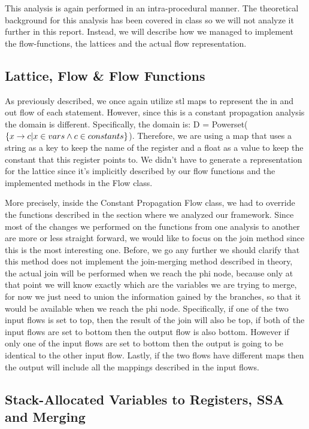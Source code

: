 This analysis is again performed in an intra-procedural manner. The theoretical background for this analysis has been covered in class so we will not analyze it further in this report. Instead, we will describe how we managed to implement the flow-functions, the lattices and the actual flow representation. 


\subsection{Lattice, Flow \& Flow Functions}
As previously described, we once again utilize stl maps to represent the in and out flow of each statement. However, since this is a constant propagation analysis the domain is different. Specifically, the domain is: D = Powerset($\{x\rightarrow c|x\in vars \wedge c\in constants\}$). Therefore, we are using a map that uses a string as a key to keep the name of the register and a float as a value to keep the constant that this register points to. We didn't have to generate a representation for the lattice since it's implicitly described by our flow functions and the implemented methods in the Flow class. 

More precisely, inside the Constant Propagation Flow class, we had to override the functions described in the section where we analyzed our framework. Since most of the changes we performed on the functions from one analysis to another are more or less straight forward, we would like to focus on the join method since this is the most interesting one. Before, we go any further we should clarify that this method does not implement the join-merging method described in theory, the actual join will be performed when we reach the phi node, because only at that point we will know exactly which are the variables we are trying to merge, for now we just need to union the information gained by the branches, so that it would be available when we reach the phi node. Specifically, if one of the two input flows is set to top, then the result of the join will also be top, if both of the input flows are set to bottom then the output flow is also bottom. However if only one of the input flows are set to bottom then the output is going to be identical to the other input flow. Lastly, if the two flows have different maps then the output will include all the mappings described in the input flows. 

\subsection*{Stack-Allocated Variables to Registers, SSA and Merging}

